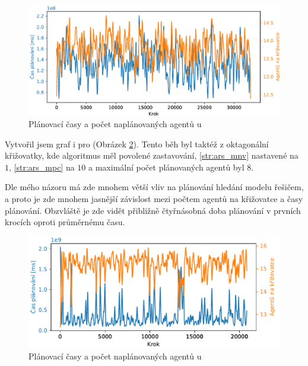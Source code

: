 \begin{figure}[h]
	\centering
	\includegraphics[width=140mm]{../img/CasVsAgentiSATRSG}
	\caption{Plánovací časy a počet naplánovaných agentů u }
	\label{fig:cas_vs_agenti_satrsg}
\end{figure}

Vytvořil jsem graf i pro  (Obrázek \ref{fig:cas_vs_agenti_satra}).
Tento běh byl taktéž z oktagonální křižovatky, kde algoritmus měl povolené zastavování,
\ref{str:ars_mnv} nastavené na $1$, \ref{str:ars_mpc} na $10$ a maximální počet plánovaných agentů byl $8$.

Dle mého názoru má zde mnohem větší vliv na plánování hledání modelu řešičem,
a proto je zde mnohem jasnější závislost mezi počtem agentů na křižovatce a časy plánování.
Obzvláště je zde vidět přibližně čtyřnásobná doba plánování v prvních krocích oproti průměrnému času.


\begin{figure}[h]
	\centering
	\includegraphics[width=140mm]{../img/CasVsAgentiSATRA}
	\caption{Plánovací časy a počet naplánovaných agentů u }
	\label{fig:cas_vs_agenti_satra}
\end{figure}

